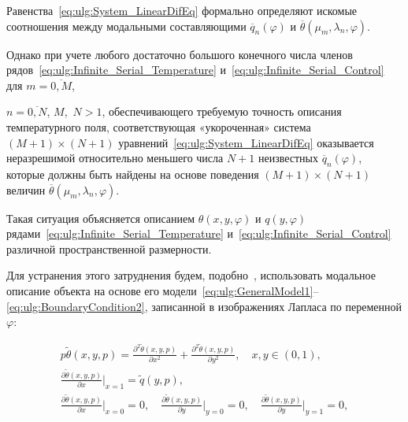 Равенства~\eqref{eq:ulg:System_LinearDifEq} формально определяют искомые соотношения между модальными составляющими ${\overline q _n}(\varphi )$ и  $ \overline {\theta } (\mu _m,\lambda _n,\varphi ) $. 

Однако при учете любого достаточно большого конечного числа членов рядов~\eqref{eq:ulg:Infinite_Serial_Temperature} и~\eqref{eq:ulg:Infinite_Serial_Control} для $ m = \overline {0,M}$,

$n = \overline {0,N}$, $M$,~$N > 1 $, обеспечивающего требуемую точность описания температурного поля, соответствующая «укороченная» система $ (M + 1) \times (N + 1) $ уравнений~\eqref{eq:ulg:System_LinearDifEq} оказывается неразрешимой относительно меньшего числа  $ N + 1 $ неизвестных ${\overline q _n}(\varphi )$, которые должны быть найдены на основе поведения $ (M + 1) \times (N + 1) $  величин $ \overline {\theta } (\mu _m,\lambda _n,{\varphi }) $. 

Такая ситуация объясняется описанием $ \theta (x,y,\varphi)$ и $q(y,\varphi) $ рядами~\eqref{eq:ulg:Infinite_Serial_Temperature} и~\eqref{eq:ulg:Infinite_Serial_Control} различной пространственной размерности.



Для устранения этого затруднения будем, подобно~\cite{ulg:bib:Rapoport_Open-loop_controllability}, использовать модальное описание объекта на основе его модели~\eqref{eq:ulg:GeneralModel1}--\eqref{eq:ulg:BoundaryCondition2}, записанной в изображениях Лапласа по переменной  $ \varphi $:

\begin{gather}\label{eq:ulg:Model_Laplas}

p\widetilde \theta (x,y,p) = \frac{{\partial ^2}\widetilde \theta (x,y,p)}{\partial {x^2}} + \frac{{\partial ^2}\widetilde \theta (x,y,p)}{\partial {y^2}},\quad x,y \in ( 0,1 ),

\\

\label{eq:ulg:GU2_Laplas}

\frac{\partial \widetilde \theta (x,y,p)}{\partial x}\Bigr|_{x=1} = \widetilde q(y,p),

\\

\label{eq:ulg:GU2_Laplas}

\frac{\partial \widetilde \theta (x,y,p)}{\partial x}\Bigr|_{x=0} = 0,\quad 

\frac{\partial \widetilde \theta (x,y,p)}{\partial y}\Bigr|_{y=0} = 0,\quad 

\frac{\partial \widetilde \theta (x,y,p)}{\partial y}\Bigr|_{y=1} = 0,

\end{gather}


